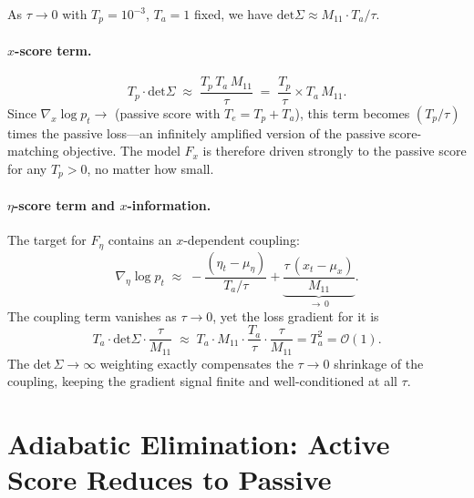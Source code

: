 \documentclass[11pt]{article}
\newcommand{\Tp}{T_p}
\newcommand{\Ta}{T_a}
\newcommand{\Te}{T_e}
\newcommand{\tauu}{\tau}
\renewcommand{\det}{\mathrm{det}}
\begin{document}
As $\tauu\to 0$ with $\Tp = 10^{-3}$, $\Ta = 1$ fixed, we have
$\det\Sigma \approx M_{11}\cdot\Ta/\tauu$.

\paragraph{$x$-score term.}
\begin{equation}
\Tp\cdot\det\Sigma \;\approx\; \frac{\Tp\,\Ta\,M_{11}}{\tauu}
\;=\; \frac{\Tp}{\tauu}\times \Ta\,M_{11}.
\end{equation}
Since $\nabla_x\log p_t\to$ (passive score with $\Te=\Tp+\Ta$), this term becomes
$(\Tp/\tauu)$ times the passive loss---an infinitely amplified version of the passive
score-matching objective.  The model $F_x$ is therefore driven strongly to the passive
score for any $\Tp > 0$, no matter how small.

\paragraph{$\eta$-score term and $x$-information.}
The target for $F_\eta$ contains an $x$-dependent coupling:
\begin{equation}
\nabla_\eta \log p_t \;\approx\;
-\frac{({\eta_t - \mu_\eta})}{\Ta/\tauu}
+\underbrace{\frac{\tauu\,(x_t - \mu_x)}{M_{11}}}_{\to\,0}.
\label{eq:eta_score_approx}
\end{equation}
The coupling term vanishes as $\tauu\to 0$, yet the loss gradient for it is
\begin{equation}
\Ta\cdot\det\Sigma\cdot\frac{\tauu}{M_{11}}
\;\approx\;
\Ta\cdot M_{11}\cdot\frac{\Ta}{\tauu}\cdot\frac{\tauu}{M_{11}} = \Ta^2 = \mathcal{O}(1).
\end{equation}
The det$\,\Sigma\to\infty$ weighting exactly compensates the $\tauu\to 0$ shrinkage of the
coupling, keeping the gradient signal finite and well-conditioned at all $\tauu$.

\section{Adiabatic Elimination: Active Score Reduces to Passive}
\end{document}
